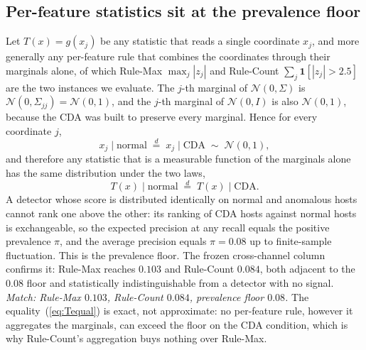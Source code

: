 \documentclass[journal]{IEEEtran}
\begin{document}
\subsection{Per-feature statistics sit at the prevalence floor}
Let $T(x) = g(x_j)$ be any statistic that reads a single coordinate $x_j$, and more generally any
per-feature rule that combines the coordinates through their marginals alone, of which Rule-Max
$\max_j |z_j|$ and Rule-Count $\sum_j \mathbf{1}[|z_j| > 2.5]$ are the two instances we evaluate.
The $j$-th marginal of $\mathcal{N}(0, \Sigma)$ is $\mathcal{N}(0, \Sigma_{jj}) = \mathcal{N}(0, 1)$,
and the $j$-th marginal of $\mathcal{N}(0, I)$ is also $\mathcal{N}(0, 1)$, because the CDA was built
to preserve every marginal. Hence for every coordinate $j$,
\begin{equation}
\label{eq:marginal_equal}
x_j \mid \text{normal} \;\stackrel{d}{=}\; x_j \mid \text{CDA} \;\sim\; \mathcal{N}(0, 1),
\end{equation}
and therefore any statistic that is a measurable function of the marginals alone has the same
distribution under the two laws,
\begin{equation}
\label{eq:Tequal}
T(x) \mid \text{normal} \;\stackrel{d}{=}\; T(x) \mid \text{CDA}.
\end{equation}
A detector whose score is distributed identically on normal and anomalous hosts cannot rank one above
the other: its ranking of CDA hosts against normal hosts is exchangeable, so the expected precision at
any recall equals the positive prevalence $\pi$, and the average precision equals $\pi = 0.08$ up to
finite-sample fluctuation. This is the prevalence floor. The frozen cross-channel column confirms it:
Rule-Max reaches $0.103$ and Rule-Count $0.084$, both adjacent to the $0.08$ floor and statistically
indistinguishable from a detector with no signal. \emph{Match: Rule-Max $0.103$, Rule-Count $0.084$,
prevalence floor $0.08$.} The equality~(\ref{eq:Tequal}) is exact, not approximate: no per-feature
rule, however it aggregates the marginals, can exceed the floor on the CDA condition, which is why
Rule-Count's aggregation buys nothing over Rule-Max.
\end{document}
